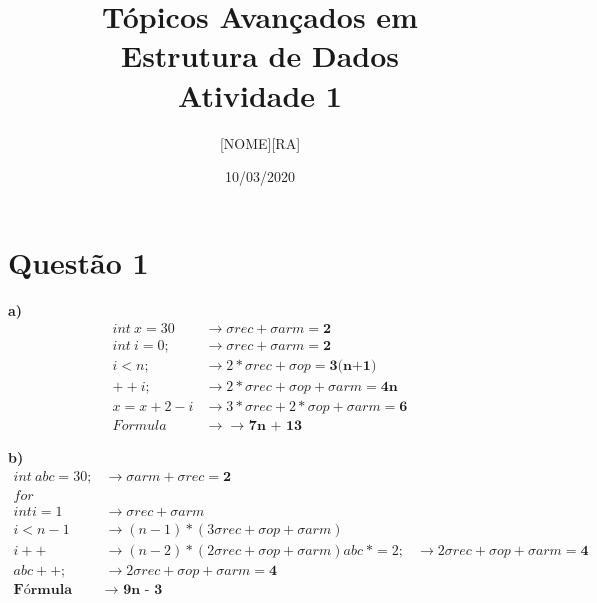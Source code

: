 \documentclass{article}
\title{
    \textbf{Tópicos Avançados em\\Estrutura de Dados\\}
    \medskip
    Atividade 1
}
\author{
\begin{tabular}{l r}
    [NOME]   & [RA]
\end{tabular}
}
\date{10/03/2020}
\begin{document}
\maketitle
\pagebreak

\section*{Questão 1}

\noindent
\textbf{a)}
\begin{align}
    int\ x = 30                  & \longrightarrow \sigma rec + \sigma arm = \textbf{2} \\
    int\ i = 0;                  & \longrightarrow \sigma rec + \sigma arm = \textbf{2} \\
    i < n;                       & \longrightarrow 2 * \sigma rec + \sigma op = \textbf{3(n+1)} \\
    ++i;                         & \longrightarrow 2 * \sigma rec + \sigma op + \sigma arm = \textbf{4n} \\ 
    x = x + 2 - i                & \longrightarrow 3 * \sigma rec + 2 * \sigma op + \sigma arm = \textbf{6} \\
    Formula                      & \longrightarrow  \textbf{$\longrightarrow$ 7n + 13}
\end{align}

\noindent
\textbf{b)}
\begin{align}
    int\ abc = 30; & \longrightarrow \sigma arm + \sigma rec = \textbf{2} \\
    for & \nonumber \\
    int i=1 & \longrightarrow \sigma rec + \sigma arm \\
    i<n-1 & \longrightarrow (n-1)*(3 \sigma rec + \sigma op + \sigma arm) \\
    i++ & \longrightarrow (n-2)*(2 \sigma rec + \sigma op + \sigma arm)
    abc\ *= 2; & \longrightarrow 2 \sigma rec + \sigma op + \sigma arm = \textbf{4} \\
    abc++; & \longrightarrow 2 \sigma rec + \sigma op + \sigma arm = \textbf{4} \\
    \textbf{Fórmula } & \textbf{$\longrightarrow$ 9n - 3} 
\end{align}
\end{document}
